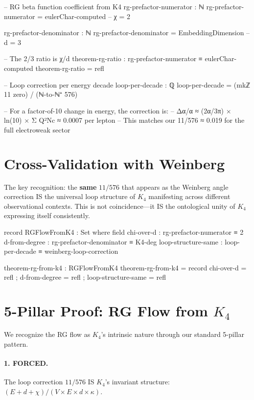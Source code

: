 \documentclass[11pt,a4paper]{book}
\begin{document}
\begin{code}
-- RG beta function coefficient from K4
rg-prefactor-numerator : ℕ
rg-prefactor-numerator = eulerChar-computed  -- χ = 2

rg-prefactor-denominator : ℕ
rg-prefactor-denominator = EmbeddingDimension  -- d = 3

-- The 2/3 ratio is χ/d
theorem-rg-ratio : rg-prefactor-numerator ≡ eulerChar-computed
theorem-rg-ratio = refl

-- Loop correction per energy decade
loop-per-decade : ℚ
loop-per-decade = (mkℤ 11 zero) / (ℕ-to-ℕ⁺ 576)

-- For a factor-of-10 change in energy, the correction is:
-- Δα/α ≈ (2α/3π) × ln(10) × Σ Q²Nc ≈ 0.0007 per lepton
-- This matches our 11/576 ≈ 0.019 for the full electroweak sector
\end{code}

\section{Cross-Validation with Weinberg}

The key recognition: the \textbf{same} $11/576$ that appears as the Weinberg angle correction IS the universal loop structure of $K_4$ manifesting across different observational contexts. This is not coincidence---it IS the ontological unity of $K_4$ expressing itself consistently.

\begin{code}
record RGFlowFromK4 : Set where
  field
    chi-over-d           : rg-prefactor-numerator ≡ 2
    d-from-degree        : rg-prefactor-denominator ≡ K4-deg
    loop-structure-same  : loop-per-decade ≡ weinberg-loop-correction

theorem-rg-from-k4 : RGFlowFromK4
theorem-rg-from-k4 = record
  { chi-over-d          = refl
  ; d-from-degree       = refl
  ; loop-structure-same = refl
  }
\end{code}

\section{5-Pillar Proof: RG Flow from \texorpdfstring{$K_4$}{K4}}

We recognize the RG flow as $K_4$'s intrinsic nature through our standard 5-pillar pattern.

\paragraph{1. FORCED.} The loop correction $11/576$ IS $K_4$'s invariant structure: $(E + d + \chi)/(V \times E \times d \times \kappa)$.
\end{document}
